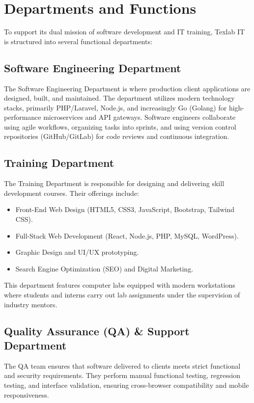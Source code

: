 \section{Departments and Functions}
To support its dual mission of software development and IT training, Texlab IT is structured into several functional departments:

\subsection{Software Engineering Department}
The Software Engineering Department is where production client applications are designed, built, and maintained. The department utilizes modern technology stacks, primarily PHP/Laravel, Node.js, and increasingly Go (Golang) for high-performance microservices and API gateways. Software engineers collaborate using agile workflows, organizing tasks into sprints, and using version control repositories (GitHub/GitLab) for code reviews and continuous integration.

\subsection{Training Department}
The Training Department is responsible for designing and delivering skill development courses. Their offerings include:
\begin{itemize}
    \item Front-End Web Design (HTML5, CSS3, JavaScript, Bootstrap, Tailwind CSS).
    \item Full-Stack Web Development (React, Node.js, PHP, MySQL, WordPress).
    \item Graphic Design and UI/UX prototyping.
    \item Search Engine Optimization (SEO) and Digital Marketing.
\end{itemize}
This department features computer labs equipped with modern workstations where students and interns carry out lab assignments under the supervision of industry mentors.

\subsection{Quality Assurance (QA) & Support Department}
The QA team ensures that software delivered to clients meets strict functional and security requirements. They perform manual functional testing, regression testing, and interface validation, ensuring cross-browser compatibility and mobile responsiveness.

